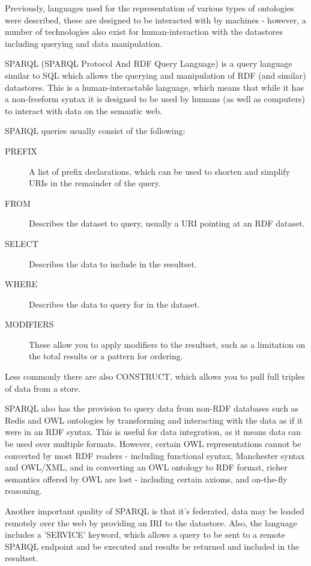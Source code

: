 \documentclass{article}
\begin{document}
Previously, languages used for the representation of various types of ontologies
were described, these are designed to be interacted with by machines - however,
a number of technologies also exist for human-interaction with the datastores
including querying and data manipulation.

SPARQL (SPARQL Protocol And RDF Query Language) is a query language similar to
SQL which allows the querying and manipulation of RDF (and similar) datastores.
This is a human-interactable language, which means that while it has a
non-freeform syntax it is designed to be used by humans (as well as computers)
to interact with data on the semantic web.

SPARQL queries usually consist of the following:

\begin{description}
    \item[PREFIX] A list of prefix declarations, which can be used to shorten
    and simplify URIs in the remainder of the query.
    \item[FROM] Describes the dataset to query, usually a URI pointing at an RDF
    dataset.
    \item[SELECT] Describes the data to include in the resultset.
    \item[WHERE] Describes the data to query for in the dataset.
    \item[MODIFIERS] These allow you to apply modifiers to the resultset, such
    as a limitation on the total results or a pattern for ordering.
\end{description}

Less commonly there are also CONSTRUCT, which allows you to pull full triples of
data from a store.

SPARQL also has the provision to query data from non-RDF databases such as Redis
and OWL ontologies by transforming and interacting with the data as if it were
in an RDF syntax. This is useful for data integration, as it means data can be
used over multiple formats. However, certain OWL representations cannot be
converted by most RDF readers - including functional syntax, Manchester syntax
and OWL/XML, and in converting an OWL ontology to RDF format, richer semantics
offered by OWL are lost - including certain axioms, and on-the-fly reasoning.

Another important quality of SPARQL is that it's federated, data may be loaded
remotely over the web by providing an IRI to the datastore. Also, the language
includes a 'SERVICE' keyword, which allows a query to be sent to a remote SPARQL
endpoint and be executed and results be returned and included in the resultset.
\end{document}
